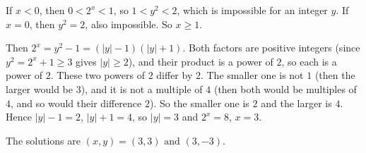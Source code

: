 If $x<0$, then $0<2^x<1$, so $1<y^2<2$, which is impossible for an integer $y$. If $x=0$, then $y^2=2$, also impossible. So $x\ge1$.

Then $2^x=y^2-1=(|y|-1)(|y|+1)$. Both factors are positive integers (since $y^2=2^x+1\ge3$ gives $|y|\ge2$), and their product is a power of $2$, so each is a power of $2$. These two powers of $2$ differ by $2$. The smaller one is not $1$ (then the larger would be $3$), and it is not a multiple of $4$ (then both would be multiples of $4$, and so would their difference $2$). So the smaller one is $2$ and the larger is $4$. Hence $|y|-1=2$, $|y|+1=4$, so $|y|=3$ and $2^x=8$, $x=3$.

The solutions are $\boxed{(x,y)=(3,3)\text{ and }(3,-3)}$.
